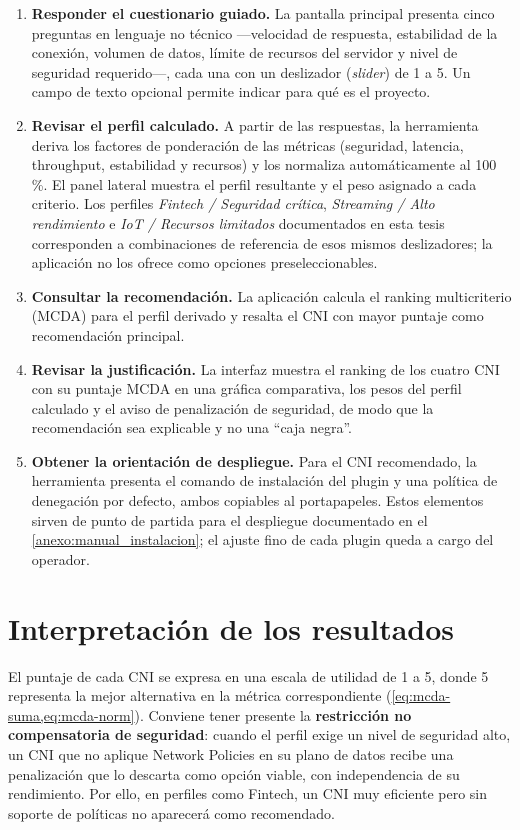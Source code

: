 \begin{enumerate}
\item \textbf{Responder el cuestionario guiado.} La pantalla principal presenta cinco preguntas en lenguaje no técnico ---velocidad de respuesta, estabilidad de la conexión, volumen de datos, límite de recursos del servidor y nivel de seguridad requerido---, cada una con un deslizador (\emph{slider}) de 1 a 5. Un campo de texto opcional permite indicar para qué es el proyecto.
\item \textbf{Revisar el perfil calculado.} A partir de las respuestas, la herramienta deriva los factores de ponderación de las métricas (seguridad, latencia, throughput, estabilidad y recursos) y los normaliza automáticamente al 100\,\%. El panel lateral muestra el perfil resultante y el peso asignado a cada criterio. Los perfiles \emph{Fintech / Seguridad crítica}, \emph{Streaming / Alto rendimiento} e \emph{IoT / Recursos limitados} documentados en esta tesis corresponden a combinaciones de referencia de esos mismos deslizadores; la aplicación no los ofrece como opciones preseleccionables.
\item \textbf{Consultar la recomendación.} La aplicación calcula el ranking multicriterio (MCDA) para el perfil derivado y resalta el CNI con mayor puntaje como recomendación principal.
\item \textbf{Revisar la justificación.} La interfaz muestra el ranking de los cuatro CNI con su puntaje MCDA en una gráfica comparativa, los pesos del perfil calculado y el aviso de penalización de seguridad, de modo que la recomendación sea explicable y no una ``caja negra''.
\item \textbf{Obtener la orientación de despliegue.} Para el CNI recomendado, la herramienta presenta el comando de instalación del plugin y una política de denegación por defecto, ambos copiables al portapapeles. Estos elementos sirven de punto de partida para el despliegue documentado en el \cref{anexo:manual_instalacion}; el ajuste fino de cada plugin queda a cargo del operador.
\end{enumerate}

\section{Interpretación de los resultados}

El puntaje de cada CNI se expresa en una escala de utilidad de 1 a 5, donde 5 representa la mejor alternativa en la métrica correspondiente (\cref{eq:mcda-suma,eq:mcda-norm}). Conviene tener presente la \textbf{restricción no compensatoria de seguridad}: cuando el perfil exige un nivel de seguridad alto, un CNI que no aplique Network Policies en su plano de datos recibe una penalización que lo descarta como opción viable, con independencia de su rendimiento. Por ello, en perfiles como Fintech, un CNI muy eficiente pero sin soporte de políticas no aparecerá como recomendado.

